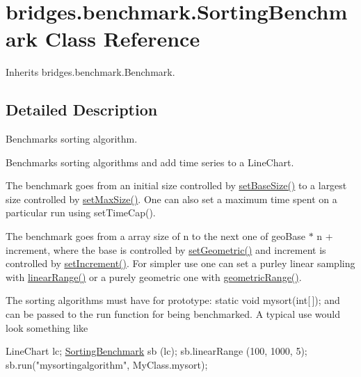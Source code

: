 \hypertarget{classbridges_1_1benchmark_1_1_sorting_benchmark}{}\section{bridges.\+benchmark.\+Sorting\+Benchmark Class Reference}
\label{classbridges_1_1benchmark_1_1_sorting_benchmark}


Inherits bridges.\+benchmark.\+Benchmark.



\subsection{Detailed Description}
Benchmarks sorting algorithm. 

Benchmarks sorting algorithms and add time series to a Line\+Chart.

The benchmark goes from an initial size controlled by \hyperlink{classbridges_1_1benchmark_1_1_sorting_benchmark_a7365a3586a08a0301ee90419a57c7aa3}{set\+Base\+Size()} to a largest size controlled by \hyperlink{classbridges_1_1benchmark_1_1_sorting_benchmark_a62db485e1a96afce2eed758e6e65555c}{set\+Max\+Size()}. One can also set a maximum time spent on a particular run using set\+Time\+Cap().

The benchmark goes from a array size of n to the next one of geo\+Base $\ast$ n + increment, where the base is controlled by \hyperlink{classbridges_1_1benchmark_1_1_sorting_benchmark_ab6871c77ec75cc58225497a8a9f45a90}{set\+Geometric()} and increment is controlled by \hyperlink{classbridges_1_1benchmark_1_1_sorting_benchmark_a1a44c5c6d5db47a26c6a801d71d85b58}{set\+Increment()}. For simpler use one can set a purley linear sampling with \hyperlink{classbridges_1_1benchmark_1_1_sorting_benchmark_a2d68f3078ea820485a9e802a5b17d3d6}{linear\+Range()} or a purely geometric one with \hyperlink{classbridges_1_1benchmark_1_1_sorting_benchmark_abc089e72c37b77a78f93e374e430ce60}{geometric\+Range()}.

The sorting algorithms must have for prototype\+: static void mysort(int\mbox{[}$\,$\mbox{]}); and can be passed to the run function for being benchmarked. A typical use would look something like


\begin{DoxyCode}
LineChart lc;
\hyperlink{classbridges_1_1benchmark_1_1_sorting_benchmark_aac0afefefe7762d001f47820dba2ed21}{SortingBenchmark} sb (lc);
sb.linearRange (100, 1000, 5);
sb.run(\textcolor{stringliteral}{"mysortingalgorithm"}, MyClass.mysort);
\end{DoxyCode}


